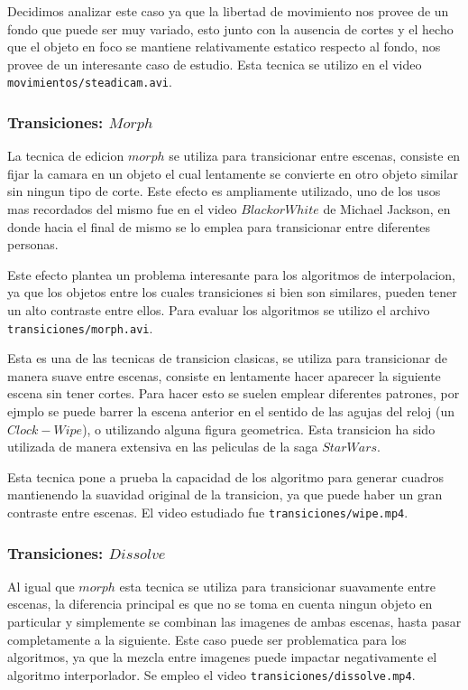 Decidimos analizar este caso ya que la libertad de movimiento nos provee de un fondo que puede ser muy variado, esto junto con la ausencia de cortes y el hecho que el objeto en foco se mantiene relativamente estatico respecto al fondo, nos provee de un interesante caso de estudio. Esta tecnica se utilizo en el video \texttt{movimientos/steadicam.avi}.

\subsubsection{Transiciones: $Morph$}

La tecnica de edicion $morph$ se utiliza para transicionar entre escenas, consiste en fijar la camara en un objeto el cual lentamente se convierte en otro objeto similar sin ningun tipo de corte. Este efecto es ampliamente utilizado, uno de los usos mas recordados del mismo fue en el video $Black or White$ de Michael Jackson, en donde hacia el final de mismo se lo emplea para transicionar entre diferentes personas.

Este efecto plantea un problema interesante para los algoritmos de interpolacion, ya que los objetos entre los cuales transiciones si bien son similares, pueden tener un alto contraste entre ellos. Para evaluar los algoritmos se utilizo el archivo \texttt{transiciones/morph.avi}.


Esta es una de las tecnicas de transicion clasicas, se utiliza para transicionar de manera suave entre escenas, consiste en lentamente hacer aparecer la siguiente escena sin tener cortes. Para hacer esto se suelen emplear diferentes patrones, por ejmplo se puede barrer la escena anterior en el sentido de las agujas del reloj (un $Clock-Wipe$), o utilizando alguna figura geometrica. Esta transicion ha sido utilizada de manera extensiva en las peliculas de la saga $Star Wars$.

Esta tecnica pone a prueba la capacidad de los algoritmo para generar cuadros mantienendo la suavidad original de la transicion, ya que puede haber un gran contraste entre escenas. El video estudiado fue \texttt{transiciones/wipe.mp4}.

\subsubsection{Transiciones: $Dissolve$}

Al igual que $morph$ esta tecnica se utiliza para transicionar suavamente entre escenas, la diferencia principal es que no se toma en cuenta ningun objeto en particular y simplemente se combinan las imagenes de ambas escenas, hasta pasar completamente a la siguiente. Este caso puede ser problematica para los algoritmos, ya que la mezcla entre imagenes puede impactar negativamente el algoritmo interporlador. Se empleo el video \texttt{transiciones/dissolve.mp4}.

